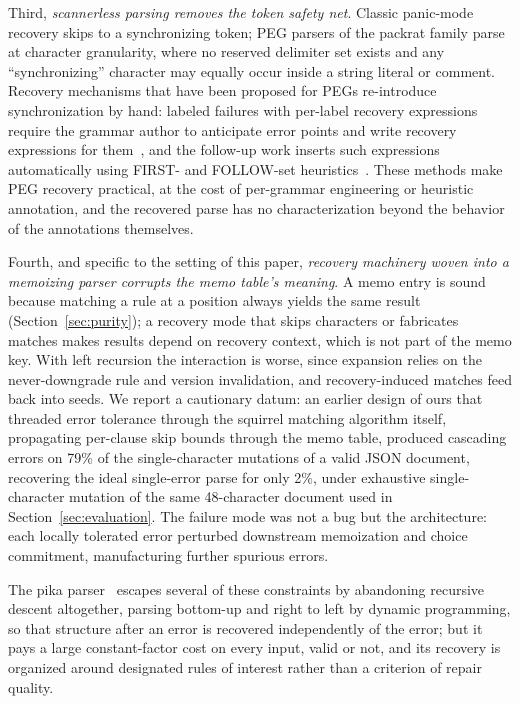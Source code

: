 \documentclass[manuscript]{acmart}
\begin{document}
Third, \emph{scannerless parsing removes the token safety net}. Classic panic-mode recovery skips to a synchronizing token; PEG parsers of the packrat family parse at character granularity, where no reserved delimiter set exists and any ``synchronizing'' character may equally occur inside a string literal or comment. Recovery mechanisms that have been proposed for PEGs re-introduce synchronization by hand: labeled failures with per-label recovery expressions require the grammar author to anticipate error points and write recovery expressions for them~\cite{medeiros2018}, and the follow-up work inserts such expressions automatically using FIRST- and FOLLOW-set heuristics~\cite{medeiros2020}. These methods make PEG recovery practical, at the cost of per-grammar engineering or heuristic annotation, and the recovered parse has no characterization beyond the behavior of the annotations themselves.

Fourth, and specific to the setting of this paper, \emph{recovery machinery woven into a memoizing parser corrupts the memo table's meaning}. A memo entry is sound because matching a rule at a position always yields the same result (Section~\ref{sec:purity}); a recovery mode that skips characters or fabricates matches makes results depend on recovery context, which is not part of the memo key. With left recursion the interaction is worse, since expansion relies on the never-downgrade rule and version invalidation, and recovery-induced matches feed back into seeds. We report a cautionary datum: an earlier design of ours that threaded error tolerance through the squirrel matching algorithm itself, propagating per-clause skip bounds through the memo table, produced cascading errors on 79\% of the single-character mutations of a valid JSON document, recovering the ideal single-error parse for only 2\%, under exhaustive single-character mutation of the same 48-character document used in Section~\ref{sec:evaluation}. The failure mode was not a bug but the architecture: each locally tolerated error perturbed downstream memoization and choice commitment, manufacturing further spurious errors.

The pika parser~\cite{hutchison2020} escapes several of these constraints by abandoning recursive descent altogether, parsing bottom-up and right to left by dynamic programming, so that structure after an error is recovered independently of the error; but it pays a large constant-factor cost on every input, valid or not, and its recovery is organized around designated rules of interest rather than a criterion of repair quality.
\end{document}

